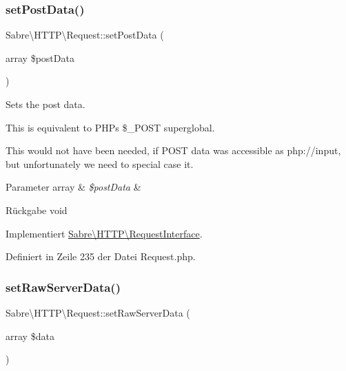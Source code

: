 \mbox{\label{class_sabre_1_1_h_t_t_p_1_1_request_acb40e160bafcfe2d3899febda483db38}} 
\subsubsection{\texorpdfstring{set\+Post\+Data()}{setPostData()}}
{\footnotesize\ttfamily Sabre\textbackslash{}\+H\+T\+T\+P\textbackslash{}\+Request\+::set\+Post\+Data (\begin{DoxyParamCaption}\item[{array}]{\$post\+Data }\end{DoxyParamCaption})}

Sets the post data.

This is equivalent to P\+HP\textquotesingle{}s \$\+\_\+\+P\+O\+ST superglobal.

This would not have been needed, if P\+O\+ST data was accessible as php\+://input, but unfortunately we need to special case it.


\begin{DoxyParams}[1]{Parameter}
array & {\em \$post\+Data} & \\
\hline
\end{DoxyParams}
\begin{DoxyReturn}{Rückgabe}
void 
\end{DoxyReturn}


Implementiert \mbox{\hyperlink{interface_sabre_1_1_h_t_t_p_1_1_request_interface_a4ba8b65d991c82677688a785a9d4014a}{Sabre\textbackslash{}\+H\+T\+T\+P\textbackslash{}\+Request\+Interface}}.



Definiert in Zeile 235 der Datei Request.\+php.

\mbox{\label{class_sabre_1_1_h_t_t_p_1_1_request_aa14eebf681c465e6077432d06e14b404}} 
\subsubsection{\texorpdfstring{set\+Raw\+Server\+Data()}{setRawServerData()}}
{\footnotesize\ttfamily Sabre\textbackslash{}\+H\+T\+T\+P\textbackslash{}\+Request\+::set\+Raw\+Server\+Data (\begin{DoxyParamCaption}\item[{array}]{\$data }\end{DoxyParamCaption})}

